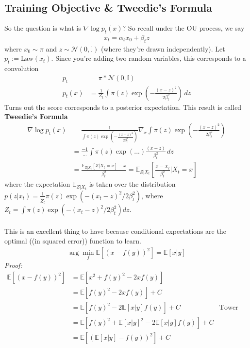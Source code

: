 \subsection{Training Objective \& Tweedie's Formula}
So the question is what is $\nabla \log p_t(x)$? So recall under the OU process, we say
\begin{align}
	x_t = \alpha_t x_0 + \beta_t z
\end{align} 
where $x_0 \sim \pi$ and $z \sim \mathcal N(0, \mathbb I)$ (where they're drawn independently). Let $p_t := \text{Law}(x_t)$. Since you're adding two random variables, this corresponds to a convolution
\begin{align}
	p_t & = \pi * \mathcal N(0, \mathbb I)\\
	p_t(x) & = \frac{1}{Z_t}\int \pi(z) \exp \left( -\frac{(x - z)^2}{2 \beta_t^2} \right) \, dz
\end{align}
Turns out the score corresponds to a posterior expectation. This result is called \textbf{Tweedie's Formula}
\begin{align}
	\nabla \log p_t(x) & = \frac{1}{\int \pi(z) \exp \left( -\frac{(x - z)^2}{2 \beta_t^2} \right)} \nabla_x \int \pi(z) \exp \left( -\frac{(x - z)^2}{2 \beta_t^2} \right)\\
	& = \frac{-1}{...}  \int \pi(z) \exp(...) \frac{(x-z)}{\beta_t^2}\, dz\\
	& = \frac{\mathbb E_{Z|X_t}[Z|X_t = x] -x}{\beta_t^2} = \mathbb E_{Z | X_t}\left[ \frac{Z - X_t}{\beta_t^2} \Big | X_t= x  \right] 
\end{align}
where the expectation $\mathbb E_{Z|X_t}$ is taken over the distribution $p(z | x_t) = \frac{1}{\tilde Z_t}   \pi(z) \exp \left( - (x_t-z)^2/2 \beta_t^2\right)$, where $Z_t = \int \pi(z) \exp \left( - (x_t-z)^2/2 \beta_t^2 \right) dz$.\\
\\
This is an excellent thing to have because conditional expectations are the optimal ((in squared error)) function to learn.
\begin{align}
	\arg \min_f\mathbb E[(x - f(y))^2] = \mathbb E[x|y]
\end{align}
\emph{Proof:}
\begin{align}
	\mathbb E[(x - f(y))^2] & = \mathbb E[x^2 + f(y)^2 -2 x f(y)]\\
	& = \mathbb E[f(y)^2 - 2 x f(y)] + C\\
	& = \mathbb E[f(y)^2 - 2 \mathbb E[x | y] f(y)] + C & \text{Tower property}\\
	& = \mathbb E[f(y)^2 + \mathbb E[x|y]^2 - 2 \mathbb E[x|y]f(y)] + C\\
	& = \mathbb E[(\mathbb E[x|y] - f(y))^2] + C
\end{align}
